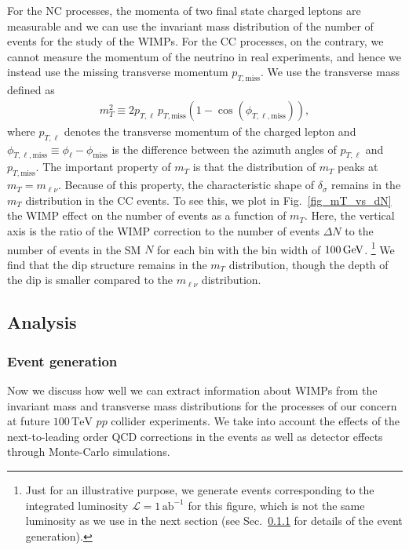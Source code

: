 \documentclass[12pt,twoside,book]{article}
\begin{document}
For the NC processes, the momenta of two final state charged leptons are measurable and we can use the invariant mass distribution of the number of events for the study of the WIMPs.
For the CC processes, on the contrary, we cannot measure the momentum of the neutrino in real experiments, and hence we instead use the missing transverse momentum $p_{T,\mathrm{miss}}$.
We use the transverse mass defined as
\begin{align}
  m_T^2 \equiv 2 p_{T, \ell}\,p_{T,\mathrm{miss}} \left( 1-\cos
  (\phi_{T,\ell,\mathrm{miss}}) \right),
\end{align}
where $p_{T, \ell}$ denotes the transverse momentum of the charged lepton and $\phi_{T,\ell,\mathrm{miss}} \equiv \phi_{\ell} - \phi_\mathrm{miss}$ is the difference between the azimuth angles of $p_{T,\ell}$ and $p_{T,\mathrm{miss}}$.
The important property of $m_T$ is that the distribution of $m_T$ peaks at $m_T = m_{\ell\nu}$.
Because of this property, the characteristic shape of $\delta_\sigma$ remains in the $m_T$ distribution in the CC events.
To see this, we plot in Fig.~\ref{fig_mT_vs_dN} the WIMP effect on the number of events as a function of $m_T$.
Here, the vertical axis is the ratio of the WIMP correction to the number of events $\Delta N$ to the number of events in the SM $N$ for each bin with the bin width of $100\, {\rm GeV}$.
\footnote{
  Just for an illustrative purpose, we generate events corresponding to the integrated luminosity $\mathcal{L} = 1\,\mathrm{ab}^{-1}$ for this figure, which is not the same luminosity as we use in the next section (see Sec.~\ref{sec_event} for details of the event generation).
}
We find that the dip structure remains in the $m_T$ distribution, though the depth of the dip is smaller compared to the $m_{\ell\nu}$ distribution.


\subsection{Analysis}
\label{sec:analysis}


\subsubsection{Event generation}
\label{sec_event}

Now we discuss how well we can extract information about WIMPs from the invariant mass and transverse mass distributions for the processes of our concern at future $100\,\mathrm{TeV}$ $pp$ collider experiments.
We take into account the effects of the next-to-leading order QCD corrections in the events as well as detector effects through Monte-Carlo simulations.
\end{document}
